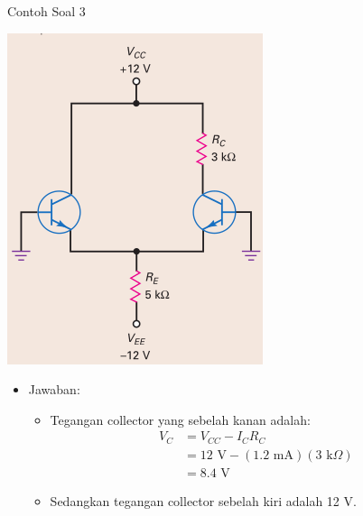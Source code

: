 \documentclass[aspectratio=169]{beamer}
\begin{document}
\begin{frame}{Contoh Soal 3}
	\begin{multicols}{2}
		\begin{center}
			\includegraphics[width=0.6\textheight]{gambar/01.latihan_soal_3}
		\end{center}
		\columnbreak
		\begin{itemize}
			\item Jawaban:
			\begin{itemize}
				\item Tegangan collector yang sebelah kanan adalah:
				\begin{align*}
					V_C &= V_{CC} - I_C R_C \\
					&= 12 \text{ V} - (1.2 \text{ mA})(3 \text{ k}\Omega) \\
					&= 8.4 \text{ V}
				\end{align*}
				\item Sedangkan tegangan collector sebelah kiri adalah 12 V.
			\end{itemize}
		\end{itemize}
		\vfill\null
	\end{multicols}
\end{frame}
\end{document}
